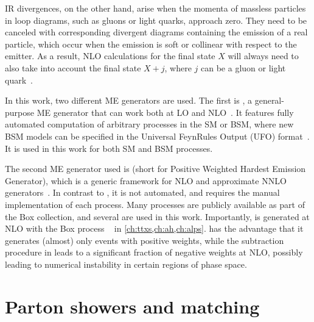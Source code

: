 IR divergences, on the other hand, arise when the momenta of massless particles in loop diagrams, such as gluons or light quarks, approach zero. They need to be canceled with corresponding divergent diagrams containing the emission of a real particle, which occur when the emission is soft or collinear with respect to the emitter. As a result, NLO calculations for the final state $X$ will always need to also take into account the final state $X+j$, where $j$ can be a gluon or light quark~\cite{Nason:2012pr}. 

In this work, two different ME generators are used. The first is \amcatnlo, a general-purpose ME generator that can work both at LO and NLO~\cite{MG5aMCatNLO:2014}. It features fully automated computation of arbitrary processes in the SM or BSM, where new BSM models can be specified in the Universal FeynRules Output (UFO) format~\cite{Degrande:2011ua}. It is used in this work for both SM and BSM processes. 

The second ME generator used is \powheg (short for Positive Weighted Hardest Emission Generator), which is a generic framework for NLO and approximate NNLO generators~\cite{Powheg:2004,Powheg:2007,Powheg:2010}. In contrast to \amcatnlo, it is not automated, and requires the manual implementation of each process. Many processes are publicly available as part of the \powheg Box collection, and several are used in this work. Importantly, \pptt is generated at NLO with the \powheg Box process \hvq~\cite{Frixione:2007nw} in \cref{ch:ttxs,ch:ah,ch:alps}. \powheg has the advantage that it generates (almost) only events with positive weights, while the subtraction procedure in \amcatnlo leads to a significant fraction of negative weights at NLO, possibly leading to numerical instability in certain regions of phase space.

\section{Parton showers and matching}
\label{sec:mc:showering}


